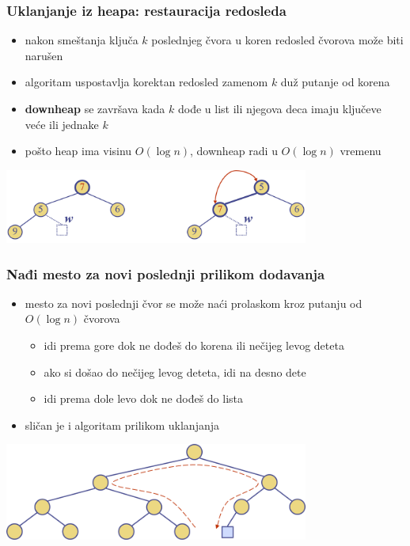\documentclass[compress,aspectratio=169]{beamer}
\begin{document}
\begin{frame}[fragile]
  \frametitle{Uklanjanje iz heapa: restauracija redosleda}
  \begin{itemize}
    \item nakon smeštanja ključa $k$ poslednjeg čvora u koren redosled čvorova
    može biti narušen
    \item algoritam  uspostavlja korektan redosled zamenom $k$
    duž putanje od korena
    \item \textbf{downheap} se završava kada $k$ dođe u list ili njegova
    deca imaju ključeve veće ili jednake $k$
    \item pošto heap ima visinu $O(\log n)$, downheap radi u $O(\log n)$ vremenu
  \end{itemize}
  \begin{center}
    \includegraphics[width=10cm]{asp-09-pic09.png}
  \end{center}
\end{frame}

\begin{frame}[fragile]
  \frametitle{Nađi mesto za novi poslednji prilikom dodavanja}
  \begin{itemize}
    \item mesto za novi poslednji čvor se može naći prolaskom kroz putanju od
    $O(\log n)$ čvorova
    \begin{itemize}
      \item idi prema gore dok ne dođeš do korena ili nečijeg levog deteta
      \item ako si došao do nečijeg levog deteta, idi na desno dete
      \item idi prema dole levo dok ne dođeš do lista
    \end{itemize}
    \item sličan je i algoritam prilikom uklanjanja
  \end{itemize}
  \begin{center}
    \includegraphics[width=10cm]{asp-09-pic10.png}
  \end{center}
\end{frame}
\end{document}
